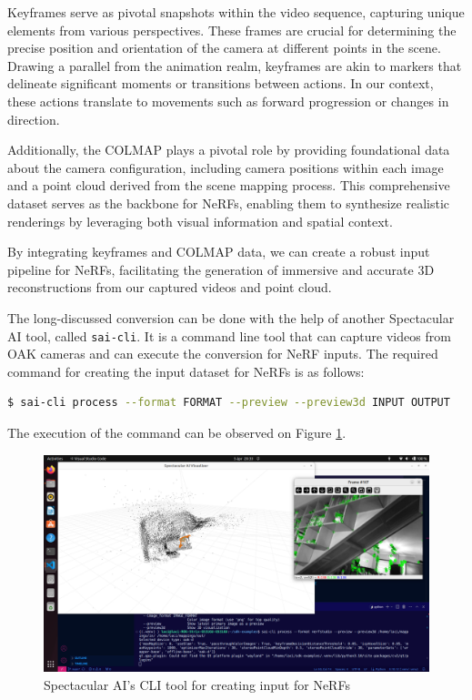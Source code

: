 Keyframes serve as pivotal snapshots within the video sequence, capturing unique elements from various perspectives. These frames are crucial for determining the precise position and orientation of the camera at different points in the scene. Drawing a parallel from the animation realm\cite{keyframes_in_animation}, keyframes are akin to markers that delineate significant moments or transitions between actions. In our context, these actions translate to movements such as forward progression or changes in direction.

Additionally, the COLMAP plays a pivotal role by providing foundational data about the camera configuration, including camera positions within each image and a point cloud derived from the scene mapping process\cite{colmap}. This comprehensive dataset serves as the backbone for NeRFs, enabling them to synthesize realistic renderings by leveraging both visual information and spatial context.

By integrating keyframes and COLMAP data, we can create a robust input pipeline for NeRFs, facilitating the generation of immersive and accurate 3D reconstructions from our captured videos and point cloud.

The long-discussed conversion can be done with the help of another Spectacular AI tool, called \verb|sai-cli|. It is a command line tool that can capture videos from OAK cameras and can execute the conversion for NeRF inputs. The required command for creating the input dataset for NeRFs is as follows:

\FloatBarrier
\begin{lstlisting}[language=bash,frame=single,float=!ht]
$ sai-cli process --format FORMAT --preview --preview3d INPUT OUTPUT
\end{lstlisting}

The execution of the command can be observed on Figure \ref{fig:sai_cli_process}. 

\begin{figure}[htbp]
	\centering
	\includegraphics[width=150mm, keepaspectratio]{figures/sai-cli_process.png}
	\caption{Spectacular AI's CLI tool for creating input for NeRFs}
	\label{fig:sai_cli_process}
\end{figure}

